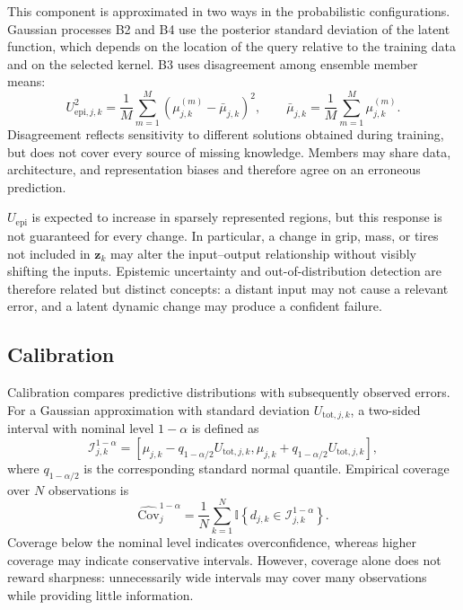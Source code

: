 \documentclass[12pt,a4paper]{report}
\begin{document}
This component is approximated in two ways in the probabilistic configurations. Gaussian processes B2 and B4 use the posterior standard deviation of the latent function, which depends on the location of the query relative to the training data and on the selected kernel. B3 uses disagreement among ensemble member means:
\begin{equation}
    U^2_{\mathrm{epi},j,k}
    =
    \frac{1}{M}
    \sum_{m=1}^{M}
    \left(
        \mu^{(m)}_{j,k}-\bar{\mu}_{j,k}
    \right)^2,
    \qquad
    \bar{\mu}_{j,k}
    =
    \frac{1}{M}\sum_{m=1}^{M}\mu^{(m)}_{j,k}.
    \label{eq:ensemble_epistemic_uncertainty}
\end{equation}
Disagreement reflects sensitivity to different solutions obtained during training, but does not cover every source of missing knowledge. Members may share data, architecture, and representation biases and therefore agree on an erroneous prediction.

$U_{\mathrm{epi}}$ is expected to increase in sparsely represented regions, but this response is not guaranteed for every change. In particular, a change in grip, mass, or tires not included in $\mathbf{z}_k$ may alter the input--output relationship without visibly shifting the inputs. Epistemic uncertainty and out-of-distribution detection are therefore related but distinct concepts: a distant input may not cause a relevant error, and a latent dynamic change may produce a confident failure.

\subsection{Calibration}


Calibration compares predictive distributions with subsequently observed errors. For a Gaussian approximation with standard deviation $U_{\mathrm{tot},j,k}$, a two-sided interval with nominal level $1-\alpha$ is defined as
\begin{equation}
    \mathcal{I}_{j,k}^{1-\alpha}
    =
    \left[
        \mu_{j,k}-q_{1-\alpha/2}U_{\mathrm{tot},j,k},
        \mu_{j,k}+q_{1-\alpha/2}U_{\mathrm{tot},j,k}
    \right],
    \label{eq:predictive_interval}
\end{equation}
where $q_{1-\alpha/2}$ is the corresponding standard normal quantile. Empirical coverage over $N$ observations is
\begin{equation}
    \widehat{\mathrm{Cov}}_{j}^{1-\alpha}
    =
    \frac{1}{N}
    \sum_{k=1}^{N}
    \mathbb{I}\!\left\{
        d_{j,k}\in\mathcal{I}_{j,k}^{1-\alpha}
    \right\}.
    \label{eq:empirical_predictive_coverage}
\end{equation}
Coverage below the nominal level indicates overconfidence, whereas higher coverage may indicate conservative intervals. However, coverage alone does not reward sharpness: unnecessarily wide intervals may cover many observations while providing little information.
\end{document}
